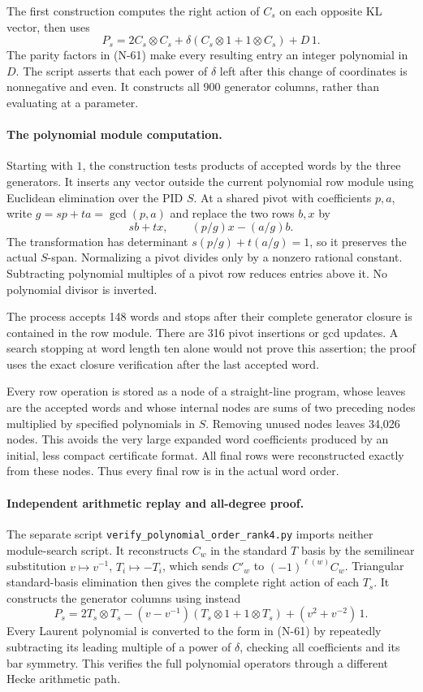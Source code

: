 The first construction computes the right action of $C_s$
on each opposite KL vector, then uses
\[
 P_s=2C_s\otimes C_s+
       \delta(C_s\otimes1+1\otimes C_s)+D\,1.
 \tag{N-62}
\]
The parity factors in (N-61) make every resulting entry an
integer polynomial in $D$.  The script asserts that each
power of $\delta$ left after this change of coordinates is
nonnegative and even.  It constructs all 900 generator
columns, rather than evaluating at a parameter.

\paragraph{The polynomial module computation.}
Starting with $1$, the construction tests products of accepted
words by the three generators.  It inserts any vector outside
the current polynomial row module using Euclidean elimination
over the PID $S$.  At a shared pivot with coefficients $p,a$,
write $g=sp+ta=\gcd(p,a)$ and replace the two rows $b,x$ by
\[
           sb+tx,\qquad (p/g)x-(a/g)b.
 \tag{N-63}
\]
The transformation has determinant
$s(p/g)+t(a/g)=1$, so it preserves the actual $S$-span.
Normalizing a pivot divides only by a nonzero rational
constant.  Subtracting polynomial multiples of a pivot row
reduces entries above it.  No polynomial divisor is inverted.

The process accepts 148 words and stops after their complete
generator closure is contained in the row module.  There
are 316 pivot insertions or gcd updates.  A search stopping
at word length ten alone would not prove this assertion;
the proof uses the exact closure verification after the
last accepted word.

Every row operation is stored as a node of a straight-line
program, whose leaves are the accepted words and whose
internal nodes are sums of two preceding nodes multiplied
by specified polynomials in $S$.  Removing unused nodes
leaves 34,026 nodes.  This avoids the very large expanded
word coefficients produced by an initial, less compact
certificate format.  All final rows were reconstructed
exactly from these nodes.  Thus every final row is in the
actual word order.

\paragraph{Independent arithmetic replay and all-degree proof.}
The separate script
\nolinkurl{verify_polynomial_order_rank4.py} imports neither
module-search script.  It reconstructs $C_w$ in the standard
$T$ basis by the semilinear substitution
$v\mapsto v^{-1}$, $T_i\mapsto-T_i$, which sends
$C'_w$ to $(-1)^{\ell(w)}C_w$.  Triangular standard-basis
elimination then gives the complete right action of each
$T_s$.  It constructs the generator columns using instead
\[
 P_s=2T_s\otimes T_s-(v-v^{-1})(T_s\otimes1+1\otimes T_s)
                         +(v^2+v^{-2})\,1.
 \tag{N-64}
\]
Every Laurent polynomial is converted to the form in (N-61)
by repeatedly subtracting its leading multiple of a power
of $\delta$, checking all coefficients and its bar symmetry.
This verifies the full polynomial operators through a
different Hecke arithmetic path.

